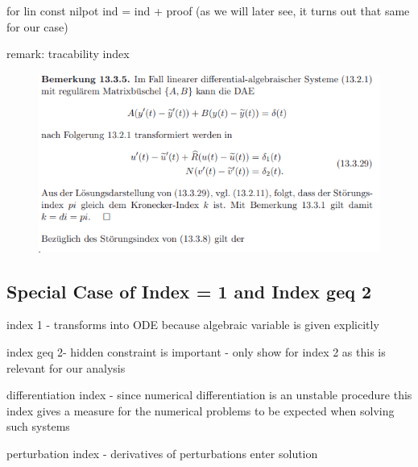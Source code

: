 for lin const nilpot ind  = ind + proof (as we will later see, it turns out that same for our case)


remark: tracability index

\begin{figure}[H]
	\centering
	\includegraphics[width=0.7\linewidth]{screenshot005}
	\caption{}
	\label{fig:screenshot005}
\end{figure}

\subsection{Special Case of Index = 1 and Index geq 2}

	index 1 - transforms into ODE because algebraic variable is given explicitly
	
	index geq 2- hidden constraint is important - only show for index 2 as this is relevant for our analysis
	


	
	differentiation index - since numerical differentiation is an unstable procedure this index gives a measure for the numerical problems to be expected when solving such systems
	
	perturbation index - derivatives of perturbations enter solution
	
	
	